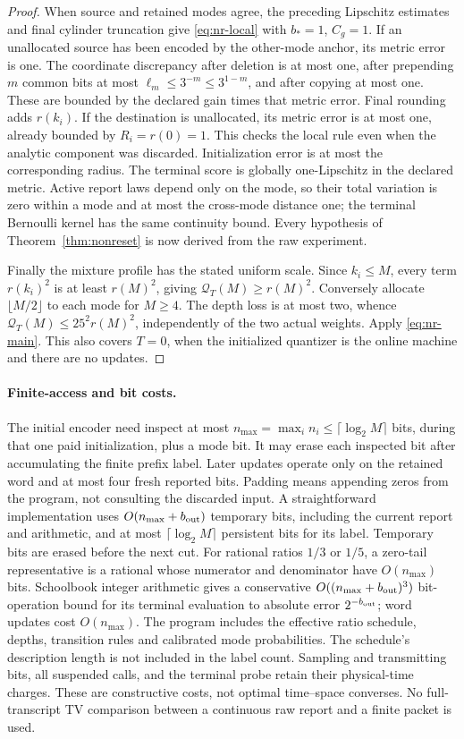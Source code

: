 \begin{proof}
When source and retained modes agree, the preceding Lipschitz estimates and final cylinder truncation give \eqref{eq:nr-local} with $b_*=1$, $C_g=1$. If an unallocated source has been encoded by the other-mode anchor, its metric error is one. The coordinate discrepancy after deletion is at most one, after prepending $m$ common bits at most $\ell_m\le3^{-m}\le3^{1-m}$, and after copying at most one. These are bounded by the declared gain times that metric error. Final rounding adds $r(k_i)$. If the destination is unallocated, its metric error is at most one, already bounded by $R_i=r(0)=1$. This checks the local rule even when the analytic component was discarded. Initialization error is at most the corresponding radius. The terminal score is globally one-Lipschitz in the declared metric. Active report laws depend only on the mode, so their total variation is zero within a mode and at most the cross-mode distance one; the terminal Bernoulli kernel has the same continuity bound. Every hypothesis of Theorem~\ref{thm:nonreset} is now derived from the raw experiment.

Finally the mixture profile has the stated uniform scale. Since $k_i\le M$, every term $r(k_i)^2$ is at least $r(M)^2$, giving $\mathcal Q_T(M)\ge r(M)^2$. Conversely allocate $\lfloor M/2\rfloor$ to each mode for $M\ge4$. The depth loss is at most two, whence $\mathcal Q_T(M)\le25^2r(M)^2$, independently of the two actual weights. Apply \eqref{eq:nr-main}. This also covers $T=0$, when the initialized quantizer is the online machine and there are no updates.
\end{proof}

\paragraph{Finite-access and bit costs.}
The initial encoder need inspect at most $n_{\max}=\max_i n_i\le\lceil\log_2M\rceil$ bits, during that one paid initialization, plus a mode bit. It may erase each inspected bit after accumulating the finite prefix label. Later updates operate only on the retained word and at most four fresh reported bits. Padding means appending zeros from the program, not consulting the discarded input. A straightforward implementation uses $O(n_{\max}+b_{\rm out})$ temporary bits, including the current report and arithmetic, and at most $\lceil\log_2M\rceil$ persistent bits for its label. Temporary bits are erased before the next cut. For rational ratios $1/3$ or $1/5$, a zero-tail representative is a rational whose numerator and denominator have $O(n_{\max})$ bits. Schoolbook integer arithmetic gives a conservative $O((n_{\max}+b_{\rm out})^3)$ bit-operation bound for its terminal evaluation to absolute error $2^{-b_{\rm out}}$; word updates cost $O(n_{\max})$. The program includes the effective ratio schedule, depths, transition rules and calibrated mode probabilities. The schedule's description length is not included in the label count. Sampling and transmitting bits, all suspended calls, and the terminal probe retain their physical-time charges. These are constructive costs, not optimal time--space converses. No full-transcript TV comparison between a continuous raw report and a finite packet is used.


